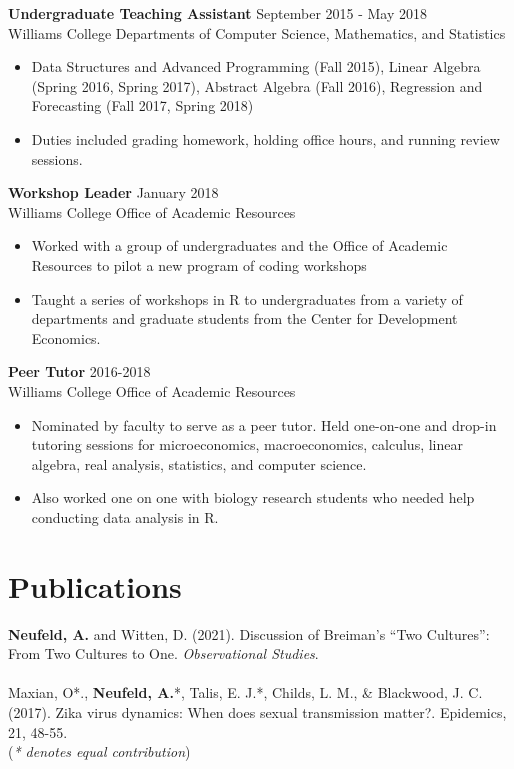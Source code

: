\documentclass[margin, 10pt]{res} %
\begin{document}
\begin{resume}
{\begin{itemize}
\end{itemize}
{\textbf{Undergraduate Teaching Assistant}} \hfill September 2015 - May 2018 \\
Williams College Departments of Computer Science, Mathematics, and Statistics
\begin{itemize}
\item Data Structures and Advanced Programming (Fall 2015), Linear Algebra (Spring 2016, Spring 2017), Abstract Algebra (Fall 2016), Regression and Forecasting (Fall 2017, Spring 2018)
\item Duties included grading homework, holding office hours, and running review sessions. 
\end{itemize}
{\textbf{Workshop Leader}} \hfill January 2018 \\
Williams College Office of Academic Resources
\begin{itemize}
\item Worked with a group of undergraduates and the Office of Academic Resources to pilot a new program of coding workshops
\item Taught a series of workshops in R to undergraduates from a variety of departments and graduate students from the Center for Development Economics. 
\end{itemize}
{\textbf{Peer Tutor}} \hfill 2016-2018 \\
Williams College Office of Academic Resources
\begin{itemize}
\item Nominated by faculty to serve as a peer tutor. Held one-on-one and drop-in tutoring sessions for microeconomics, macroeconomics, calculus, linear algebra, real analysis, statistics, and computer science.  
\item Also worked one on one with biology research students who needed help conducting data analysis in R. 
\end{itemize}

\section{Publications} 
\textbf{Neufeld, A.} and Witten, D. (2021). Discussion of Breiman’s “Two Cultures”: From Two Cultures to One. \emph{Observational Studies}.  \\
\\
Maxian, O*., \textbf{Neufeld, A.}*, Talis, E. J.*, Childs, L. M., \& Blackwood, J. C. (2017). Zika virus dynamics: When does sexual transmission matter?. Epidemics, 21, 48-55. \\
\small
(\emph{* denotes equal contribution})
\normalsize

}
\end{resume}
\end{document}
